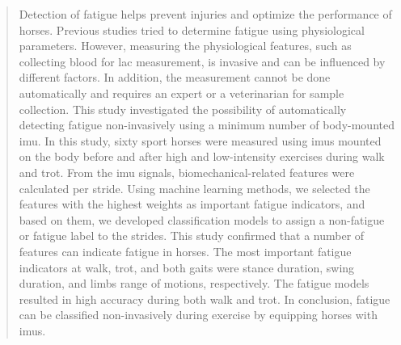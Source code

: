 \begin{quote}

Detection of fatigue helps prevent injuries and optimize the performance of horses. Previous studies tried to determine fatigue using physiological parameters. However, measuring the physiological features, such as collecting blood for \gls{lac} measurement, is invasive and can be influenced by different factors. In addition, the measurement cannot be done automatically and requires an expert or a veterinarian for sample collection. This study investigated the possibility of automatically detecting fatigue non-invasively using a minimum number of body-mounted \gls{imu}. In this study, sixty sport horses were measured using \gls{imu}s mounted on the body before and after high and low-intensity exercises during walk and trot. From the \gls{imu} signals, biomechanical-related features were calculated per stride. Using machine learning methods, we selected the features with the highest weights as important fatigue indicators, and based on them, we developed classification models to assign a non-fatigue or fatigue label to the strides. This study confirmed that a number of features can indicate fatigue in horses. The most important fatigue indicators at walk, trot, and both gaits were stance duration, swing duration, and limbs range of motions, respectively. The fatigue models resulted in high accuracy during both walk and trot. In conclusion, fatigue can be classified non-invasively during exercise by equipping horses with \gls{imu}s.

\end{quote}

